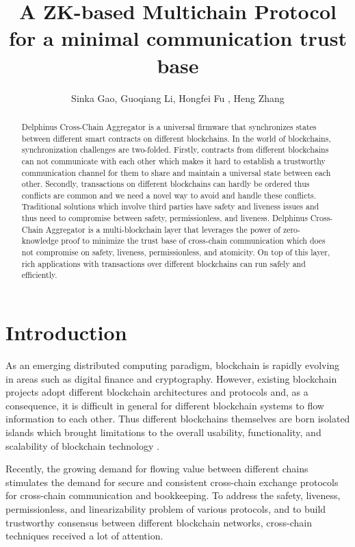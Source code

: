 \documentclass[pageno]{jpaper}
\begin{document}
\title{A ZK-based Multichain Protocol for a minimal communication trust base}
\author{Sinka Gao, Guoqiang Li, Hongfei Fu , Heng Zhang}
\newcommand{\dprotocol}{Delphinus Cross-Chain Aggregator }
\date{}
\maketitle
\thispagestyle{empty}
\begin{abstract}
\dprotocol is a universal firmware that synchronizes states between different smart contracts on different blockchains. In the world of blockchains, synchronization challenges are two-folded. Firstly, contracts from different blockchains can not communicate with each other which makes it hard to establish a trustworthy communication channel for them to share and maintain a universal state between each other. Secondly, transactions on different blockchains can hardly be ordered thus conflicts are common and we need a novel way to avoid and handle these conflicts. Traditional solutions which involve third parties have safety and liveness issues and thus need to compromise between safety, permissionless, and liveness.  \dprotocol is a multi-blockchain layer that leverages the power of zero-knowledge proof to minimize the trust base of cross-chain communication which does not compromise on safety, liveness, permissionless, and atomicity. On top of this layer, rich applications with transactions over different blockchains can run safely and efficiently.
\end{abstract}

\section{Introduction}
As an emerging distributed computing paradigm, blockchain is rapidly evolving in areas such as digital finance and cryptography. However, existing blockchain projects adopt different blockchain architectures and protocols and, as a consequence, it is difficult in general for different blockchain systems to flow information to each other. Thus different blockchains themselves are born isolated islands which brought limitations to the overall usability, functionality, and scalability of blockchain technology  \cite{anati2013innovative}.

Recently, the growing demand for flowing value between different chains stimulates the demand for secure and consistent cross-chain exchange protocols for cross-chain communication and bookkeeping.  To address the safety, liveness, permissionless, and linearizability problem of various protocols, and to build trustworthy consensus between different blockchain networks, cross-chain techniques received a lot of attention.
\end{document}

